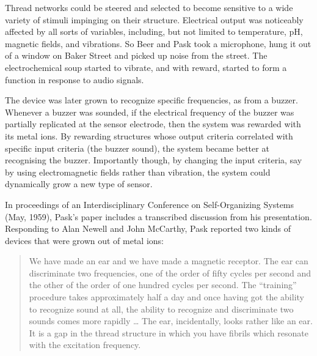 Thread networks could be steered and selected to become sensitive to a wide variety of stimuli impinging on their structure.
Electrical output was noticeably affected by all sorts of variables, including, but not limited to temperature, pH, magnetic fields, and vibrations.
So Beer and Pask took a microphone, 
hung it out of a window on Baker Street
and picked up noise from the street.
The electrochemical soup started to vibrate, and with reward, started to form a function in response to audio signals.

The device was later grown to recognize specific frequencies, as from a buzzer.
Whenever a buzzer was sounded,
if the electrical frequency of the buzzer was partially replicated at the sensor electrode, 
then the system was rewarded with its metal ions. 
By rewarding structures whose
output criteria correlated with specific input criteria (the buzzer sound), the system became better at recognising the buzzer.
Importantly though, by changing the input criteria, say by using electromagnetic fields rather than vibration, the system could dynamically grow a new type of sensor.


In proceedings of an Interdisciplinary Conference on Self-Organizing Systems 
(May, 1959),
Pask's paper \cite{pask1960natural} includes a transcribed discussion from his presentation.
Responding to Alan Newell and John McCarthy, Pask reported two kinds of devices that were grown out of metal ions:
\begin{quote}
\small
We have made an ear and we have made a magnetic receptor. The
ear can discriminate two frequencies, one of the order of fifty cycles per second and the other of the order of one hundred cycles per second. 
The ``training'' procedure takes approximately half a day and once having got the ability to recognize sound at all, the ability to recognize and discriminate two sounds comes more rapidly%
\dots
The ear, incidentally, looks rather like an ear. It is a gap in the thread structure in which you have fibrils which resonate with the excitation frequency.
\end{quote}




